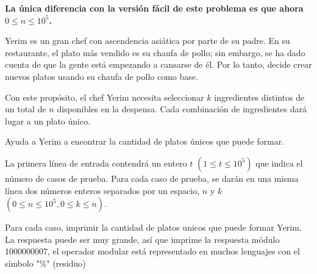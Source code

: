 
\textbf{La única diferencia con la versión fácil de este problema es que ahora~$0 \leq n \leq 10^5$.}

Yerim es un gran chef con ascendencia asiática por parte de su padre. En su restaurante, el plato más vendido es su chaufa de pollo; sin embargo, se ha dado cuenta de que la gente está empezando a cansarse de él. Por lo tanto, decide crear nuevos platos usando su chaufa de pollo como base.

Con este propósito, el chef Yerim necesita seleccionar $k$ ingredientes distintos de un total de $n$ disponibles en la despensa. Cada combinación de ingredientes dará lugar a un plato único.

Ayuda a Yerim a encontrar la cantidad de platos únicos que puede formar.


La primera línea de entrada contendrá un entero $t$ $(1\leq t \leq 10^5)$ que indica el número de casos de prueba. Para cada caso de prueba, se darán en una misma línea dos números enteros separados por un espacio, $n$ y $k$ $(0 \leq n \leq 10^5, 0 \leq k \leq n)$.

\outputText

Para cada caso, imprimir la cantidad de platos unicos que puede formar Yerim.\\
La respuesta puede ser muy grande, así que imprime la respuesta módulo 1000000007, el operador modular está representado en muchos lenguajes con el símbolo "\%" (residuo)

\exampleCases

\begin{example}
\end{example}
